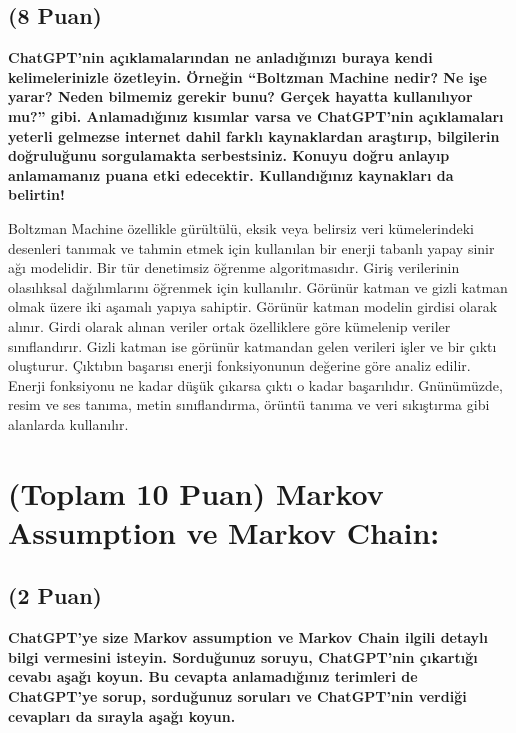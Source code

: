 \documentclass[11pt]{article}
\begin{document}
\subsection{(8 Puan)} \textbf{ChatGPT’nin açıklamalarından ne anladığınızı buraya kendi kelimelerinizle özetleyin. Örneğin ``Boltzman Machine nedir? Ne işe yarar? Neden bilmemiz gerekir bunu? Gerçek hayatta kullanılıyor mu?'' gibi. Anlamadığınız kısımlar varsa ve ChatGPT’nin açıklamaları yeterli gelmezse internet dahil farklı kaynaklardan araştırıp, bilgilerin doğruluğunu sorgulamakta serbestsiniz. Konuyu doğru anlayıp anlamamanız puana etki edecektir. Kullandığınız kaynakları da belirtin!}

Boltzman Machine özellikle gürültülü, eksik veya belirsiz veri kümelerindeki desenleri tanımak ve tahmin etmek için kullanılan bir enerji tabanlı yapay sinir ağı modelidir. Bir tür denetimsiz öğrenme algoritmasıdır. Giriş verilerinin olasılıksal dağılımlarını öğrenmek için kullanılır. Görünür katman ve gizli katman olmak üzere iki aşamalı yapıya sahiptir. \newline \newline Görünür katman modelin girdisi olarak alınır. Girdi olarak alınan veriler ortak özelliklere göre kümelenip veriler sınıflandırır. Gizli katman ise görünür katmandan gelen verileri işler ve bir çıktı oluşturur.
Çıktıbın başarısı enerji fonksiyonunun değerine göre analiz edilir. Enerji fonksiyonu ne kadar düşük çıkarsa çıktı o kadar başarılıdır.
\newline\newline
Gnünümüzde, resim ve ses tanıma, metin sınıflandırma, örüntü tanıma ve veri sıkıştırma gibi alanlarda kullanılır. 
\newline

\section{(Toplam 10 Puan) Markov Assumption ve Markov Chain:}

\subsection{(2 Puan)} \textbf{ChatGPT’ye size Markov assumption ve Markov Chain ilgili detaylı bilgi vermesini isteyin. Sorduğunuz soruyu, ChatGPT'nin çıkartığı cevabı aşağı koyun. Bu cevapta anlamadığınız terimleri de ChatGPT’ye sorup, sorduğunuz soruları ve ChatGPT’nin verdiği cevapları da sırayla aşağı koyun.}
 
\end{document}
